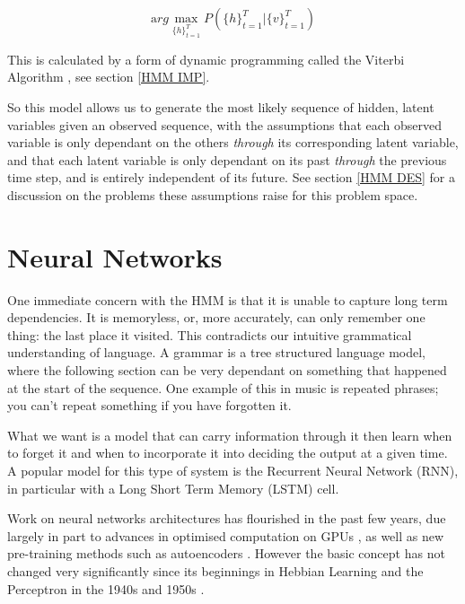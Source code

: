 \documentclass[bsc,singlespacing,logo, parskip, deptreport]{infthesis}
\begin{document}
\begin{equation}
  {\mathrm arg}\max_{\{h\}_{t=1}^{T}} P(\{h\}_{t=1}^{T} | \{v\}_{t=1}^{T})
\end{equation}

This is calculated by a form of dynamic programming called the Viterbi Algorithm \cite{russell2002artificial}, see section \ref{HMM IMP}.

So this model allows us to generate the most likely sequence of hidden, latent variables given an observed sequence, with the assumptions that each observed variable is only dependant on the others {\em through} its corresponding latent variable, and that each latent variable is only dependant on its past {\em through} the previous time step, and is entirely independent of its future. See section \ref{HMM DES} for a discussion on the problems these assumptions raise for this problem space.

\section{Neural Networks}

One immediate concern with the HMM is that it is unable to capture long term dependencies. It is memoryless, or, more accurately, can only remember one thing: the last place it visited. This contradicts our intuitive grammatical understanding of language. A grammar is a tree structured language model, where the following section can be very dependant on something that happened at the start of the sequence. One example of this in music is repeated phrases; you can't repeat something if you have forgotten it.

What we want is a model that can carry information through it then learn when to forget it and when to incorporate it into deciding the output at a given time. A popular model for this type of system is the Recurrent Neural Network (RNN), in particular with a Long Short Term Memory (LSTM) cell.

Work on neural networks architectures has flourished in the past few years, due largely in part to advances in optimised computation on GPUs \cite{oh2004gpu}\cite{krizhevsky2012imagenet}, as well as new pre-training methods such as autoencoders \cite{hinton2006reducing}\cite{vincent2008extracting}\cite{deng2010binary}. However the basic concept has not changed very significantly since its beginnings in Hebbian Learning and the Perceptron in the 1940s and 1950s \cite{hebb1949first} \cite{rosenblatt1958perceptron}.
\end{document}
